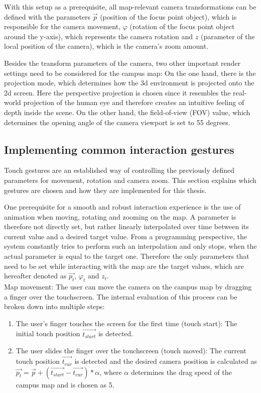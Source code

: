 With this setup as a prerequisite, all map-relevant camera transformations can be defined with the parameters $\overrightarrow{p}$ (position of the focus point object), which is responsible for the camera movement, $\varphi$ (rotation of the focus point object around the y-axis), which represents the camera rotation and $z$ (parameter of the local position of the camera), which is the camera's zoom amount.

Besides the transform parameters of the camera, two other important render settings need to be considered for the campus map: On the one hand, there is the projection mode, which determines how the 3d environment is projected onto the 2d screen. Here the perspective projection is chosen since it resembles the real-world projection of the human eye and therefore creates an intuitive feeling of depth inside the scene. On the other hand, the field-of-view (FOV) value, which determines the opening angle of the camera viewport is set to 55 degrees. 

\subsection{Implementing common interaction gestures}
Touch gestures are an established way of controlling the previously defined parameters for movement, rotation and camera zoom. This section explains which gestures are chosen and how they are implemented for this thesis.

One prerequisite for a smooth and robust interaction experience is the use of animation when moving, rotating and zooming on the map. A parameter is therefore not directly set, but rather linearly interpolated over time between its current value and a desired target value. From a programming perspective, the system constantly tries to perform such an interpolation and only stops, when the actual parameter is equal to the target one. Therefore the only parameters that need to be set while interacting with the map are the target values, which are hereafter denoted as $\overrightarrow{p_{t}}$, $\varphi_{t}$ and $z_{t}$.\\

Map movement: The user can move the camera on the campus map by dragging a finger over the touchscreen. The internal evaluation of this process can be broken down into multiple steps:

\begin{enumerate}
	\item The user's finger touches the screen for the first time (touch start): The initial touch position $\overrightarrow{t_{start}}$ is detected.
	\item The user slides the finger over the touchscreen (touch moved): The current touch position $\overrightarrow{t_{cur}}$ is detected and the desired camera position is calculated as $\overrightarrow{p_{t}} = \overrightarrow{p} + (\overrightarrow{t_{start}} - \overrightarrow{t_{cur}}) * \alpha$, where $\alpha$ determines the drag speed of the campus map and is chosen as 5.
\end{enumerate}

